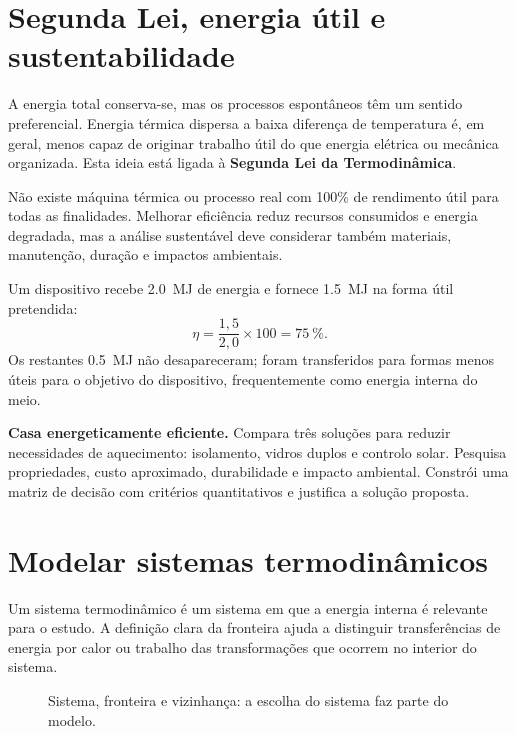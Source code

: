 \documentclass[11pt,a4paper,oneside]{book}
\begin{document}
\section{Segunda Lei, energia útil e sustentabilidade}
A energia total conserva-se, mas os processos espontâneos têm um sentido preferencial. Energia térmica dispersa a baixa diferença de temperatura é, em geral, menos capaz de originar trabalho útil do que energia elétrica ou mecânica organizada. Esta ideia está ligada à \textbf{Segunda Lei da Termodinâmica}.

Não existe máquina térmica ou processo real com 100\% de rendimento útil para todas as finalidades. Melhorar eficiência reduz recursos consumidos e energia degradada, mas a análise sustentável deve considerar também materiais, manutenção, duração e impactos ambientais.

\begin{exemplo}[title=Exemplo resolvido -- eficiência energética]
Um dispositivo recebe \SI{2.0}{MJ} de energia e fornece \SI{1.5}{MJ} na forma útil pretendida:
\[
\eta=\frac{1{,}5}{2{,}0}\times100=\SI{75}{\percent}.
\]
Os restantes \SI{0.5}{MJ} não desapareceram; foram transferidos para formas menos úteis para o objetivo do dispositivo, frequentemente como energia interna do meio.
\end{exemplo}

\begin{stem}
\textbf{Casa energeticamente eficiente.} Compara três soluções para reduzir necessidades de aquecimento: isolamento, vidros duplos e controlo solar. Pesquisa propriedades, custo aproximado, durabilidade e impacto ambiental. Constrói uma matriz de decisão com critérios quantitativos e justifica a solução proposta.
\end{stem}


\section{Modelar sistemas termodinâmicos}
Um sistema termodinâmico é um sistema em que a energia interna é relevante para o estudo. A definição clara da fronteira ajuda a distinguir transferências de energia por calor ou trabalho das transformações que ocorrem no interior do sistema.

\begin{figure}[H]
\centering
{}
\caption{Sistema, fronteira e vizinhança: a escolha do sistema faz parte do modelo.}
\end{figure}
\end{document}
